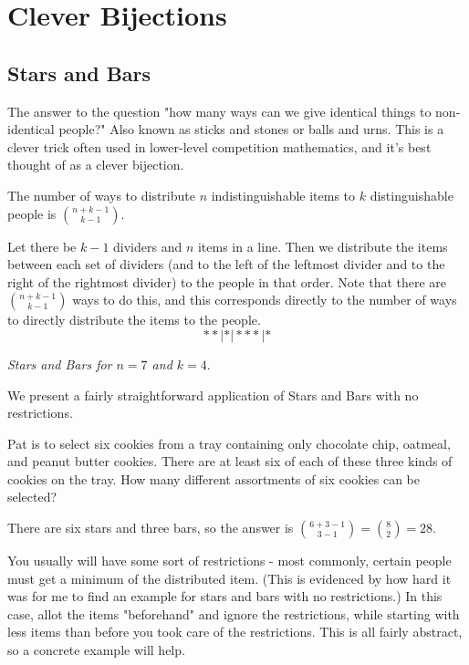 \documentclass[blue,onecol]{shooting}
\begin{document}
\section{Clever Bijections}

\subsection{Stars and Bars}
The answer to the question "how many ways can we give identical things to non-identical people?" Also known as sticks and stones or balls and urns. This is a clever trick often used in lower-level competition mathematics, and it's best thought of as a clever bijection.

\begin{theo}
The number of ways to distribute $n$ indistinguishable items to $k$ distinguishable people is $\binom{n+k-1}{k-1}.$
\end{theo}

\begin{pro}
Let there be $k-1$ dividers and $n$ items in a line. Then we distribute the items between each set of dividers (and to the left of the leftmost divider and to the right of the rightmost divider) to the people in that order. Note that there are $\binom{n+k-1}{k-1}$ ways to do this, and this corresponds directly to the number of ways to directly distribute the items to the people.
\[**|*|***|*\]
\begin{center}
    \textit{Stars and Bars for $n=7$ and $k=4.$}
\end{center}
\end{pro}

We present a fairly straightforward application of Stars and Bars with no restrictions.

\begin{exam}[AMC 10A 2003/21]
Pat is to select six cookies from a tray containing only chocolate chip, oatmeal, and peanut butter cookies. There are at least six of each of these three kinds of cookies on the tray. How many different assortments of six cookies can be selected?
\end{exam}

\begin{sol}
There are six stars and three bars, so the answer is $\binom{6+3-1}{3-1}=\binom{8}{2}=28.$
\end{sol}

You usually will have some sort of restrictions - most commonly, certain people must get a minimum of the distributed item. (This is evidenced by how hard it was for me to find an example for stars and bars with no restrictions.) In this case, allot the items "beforehand" and ignore the restrictions, while starting with less items than before you took care of the restrictions. This is all fairly abstract, so a concrete example will help.
\end{document}
